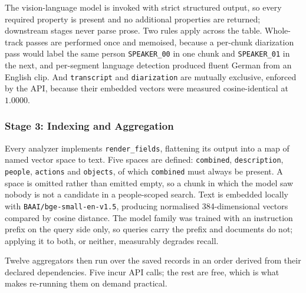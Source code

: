 \documentclass[11pt,a4paper]{article}
\begin{document}
The vision-language model is invoked with strict structured output, so every
required property is present and no additional properties are returned;
downstream stages never parse prose. Two rules apply across the table.
Whole-track passes are performed once and memoised, because a per-chunk
diarization pass would label the same person \texttt{SPEAKER\_00} in one chunk
and \texttt{SPEAKER\_01} in the next, and per-segment language detection
produced fluent German from an English clip. And \texttt{transcript} and
\texttt{diarization} are mutually exclusive, enforced by the API, because their
embedded vectors were measured cosine-identical at $1.0000$.

\subsubsection*{Stage 3: Indexing and Aggregation}

Every analyzer implements \texttt{render\_fields}, flattening its output into a
map of named vector space to text. Five spaces are defined: \texttt{combined},
\texttt{description}, \texttt{people}, \texttt{actions} and \texttt{objects}, of
which \texttt{combined} must always be present. A space is omitted rather than
emitted empty, so a chunk in which the model saw nobody is not a candidate in a
people-scoped search. Text is embedded locally with
\texttt{BAAI/bge-small-en-v1.5}, producing normalised 384-dimensional vectors
compared by cosine distance. The model family was trained with an instruction
prefix on the query side only, so queries carry the prefix and documents do not;
applying it to both, or neither, measurably degrades recall.

Twelve aggregators then run over the saved records in an order derived from
their declared dependencies. Five incur API calls; the rest are free, which is
what makes re-running them on demand practical.
\end{document}
